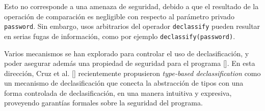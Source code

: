 	Esto no corresponde a una amenaza de seguridad, debido a que el resultado de la operación de comparación es negligible con respecto al parámetro privado \texttt{password}. Sin embargo, usos arbitrarios del operador \texttt{declassify} pueden resultar en serias fugas de información, como por ejemplo \texttt{declassify(password)}.

	Varios mecanismos se han explorado para controlar el uso de declasificación, y poder asegurar además una propiedad de seguridad para el programa []. En esta dirección, Cruz et al. [] recientemente propusieron \textit{type-based declassification} como un mecanismo de declasificación que conecta la abstracción de tipos con una forma controlada de declasificación, en una manera intuitiva y expresiva, proveyendo garantías formales sobre la seguridad del programa. %
